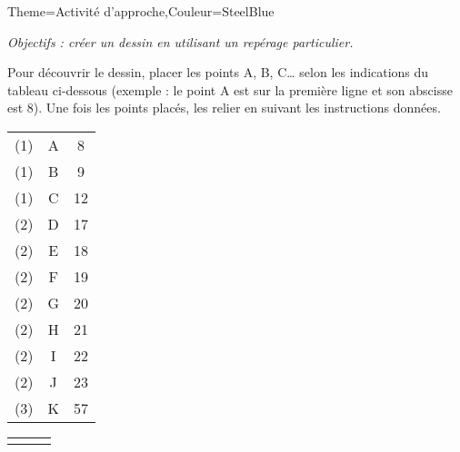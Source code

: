 \begin{Maquette}[Cours]{Theme={Activité d'approche},Couleur={SteelBlue}}


      {\it Objectifs : créer un dessin en utilisant un repérage particulier.}

      \begin{AActivite}

            Pour découvrir le dessin, placer les points A, B, C\dots{} selon les indications du tableau ci-dessous (exemple : le point A est sur la première ligne et son abscisse est 8). Une fois les points placés, les relier en suivant les instructions données.
         
            \begin{center}
               {\setlength{\tabcolsep}{1pt} 
               \begin{tabular}{|*{3}{C{0.9}|}}
                  \hline
                   &  &  \\
                  \hline
                  (1) & A & 8 \\
                  \hline
                  (1) & B & 9 \\
                  \hline
                  (1) & C & 12 \\
                  \hline
                  (2) & D & 17 \\
                  \hline
                  (2) & E & 18 \\
                  \hline
                  (2) & F& 19 \\
                  \hline
                  (2) & G & 20 \\
                  \hline
                  (2) & H & 21 \\
                  \hline
                  (2) & I & 22 \\
                  \hline
                  (2) & J & 23 \\
                  \hline
                  (3) & K & 57 \\
                  \hline
               \end{tabular}
               \hfill
               \begin{tabular}{|*{3}{C{0.9}|}}
                  \hline
                   &  &  \\

\end{tabular}}
\end{center}
\end{AActivite}
\end{Maquette}
